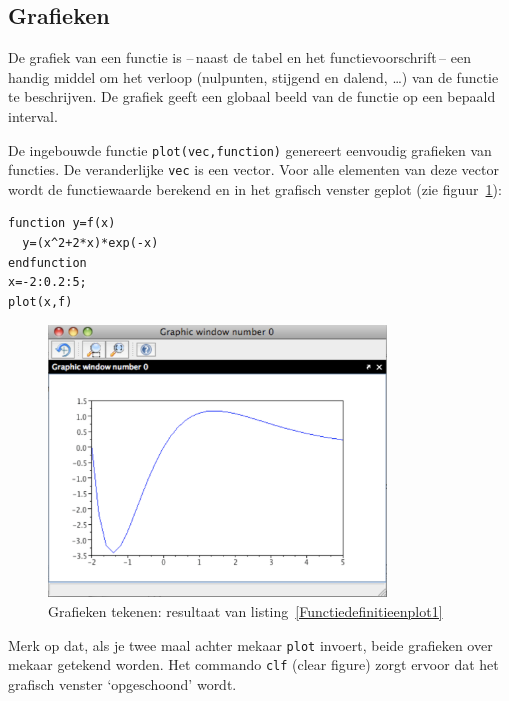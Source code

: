 \subsection{Grafieken}
\label{sec:grafiek}
De grafiek van een functie is --\,naast de tabel en het functievoorschrift\,-- een handig middel om het verloop (nulpunten, stijgend en dalend, \dots) van de functie te beschrijven. De grafiek geeft een globaal beeld van de functie op een bepaald interval.

De ingebouwde functie \verb+plot(vec,function)+ genereert eenvoudig grafieken van functies.
De veranderlijke \verb+vec+ is een vector. Voor alle elementen van deze vector wordt de
functiewaarde berekend en in het grafisch venster geplot (zie figuur~\ref{figg:functie1}):

\begin{center}
\begin{minipage}{.95\linewidth}
\begin{lstlisting}[caption={Functiedefinitie en plot}, label={Functiedefinitieenplot1}]	
function y=f(x)
  y=(x^2+2*x)*exp(-x)
endfunction
x=-2:0.2:5;
plot(x,f)
\end{lstlisting}
\end{minipage}
\end{center}

\begin{figure}[h!t]
   \begin{center}
  \includegraphics[width=0.8\textwidth]{figuren/scilab/08grafiek.pdf}
  \caption{Grafieken tekenen: resultaat van listing~\ref{Functiedefinitieenplot1}}
	\label{figg:functie1}
	\end{center}
\end{figure}


Merk op dat, als je twee maal achter mekaar \verb+plot+ invoert, beide grafieken over mekaar getekend worden.
Het commando \verb+clf+ (clear figure) zorgt ervoor dat het grafisch venster `opgeschoond' wordt. 

